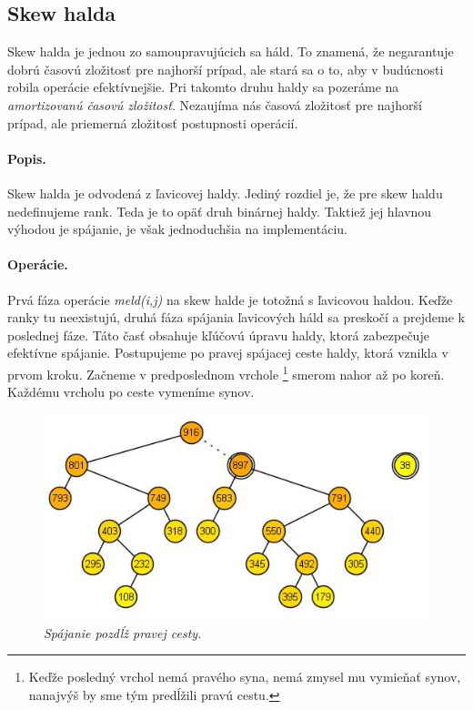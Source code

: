 \subsection{Skew halda} 
Skew halda je jednou zo samoupravujúcich sa háld. To znamená, že negarantuje dobrú časovú zložitosť pre najhorší prípad, ale stará 
sa o to, aby v budúcnosti robila operácie efektívnejšie. Pri takomto druhu haldy sa pozeráme na \emph{amortizovanú časovú 
zložitosť}. Nezaujíma nás časová zložitosť pre najhorší prípad, ale priemerná zložitosť postupnosti operácií.

\paragraph{Popis.}
Skew halda je odvodená z ľavicovej haldy. Jediný rozdiel je, že pre skew haldu nedefinujeme rank. Teda je to opäť druh binárnej 
haldy. Taktiež jej hlavnou výhodou je spájanie, je však jednoduchšia na implementáciu.


\paragraph{Operácie.}
Prvá fáza operácie \emph{meld(i,j)} na skew halde je totožná s ľavicovou haldou. Keďže ranky tu neexistujú, druhá fáza spájania 
ľavicových háld sa preskočí a prejdeme k poslednej fáze. Táto časť obsahuje kľúčovú úpravu haldy, ktorá zabezpečuje efektívne 
spájanie. Postupujeme po pravej spájacej ceste haldy, ktorá vznikla v prvom kroku. Začneme v predposlednom vrchole%
\footnote{Keďže posledný vrchol nemá pravého syna, nemá zmysel mu vymieňať synov, nanajvýš by sme tým predĺžili pravú cestu.} 
smerom nahor až po koreň. Každému vrcholu po ceste vymeníme synov.


\begin{figure}
\includegraphics[width=\columnwidth]{obrazky/skewinsert.png}
\caption{\emph{Spájanie pozdĺž pravej cesty.}} 
\label{img:skew} 
\end{figure}

